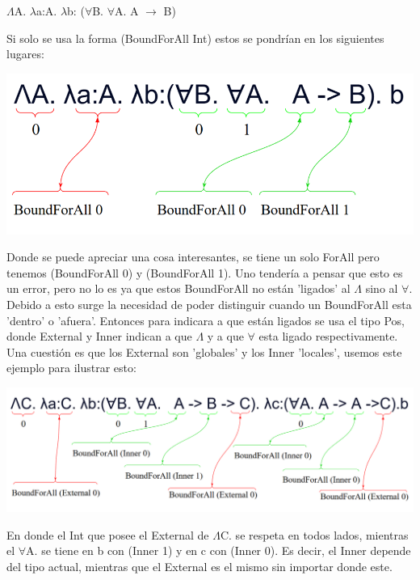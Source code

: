 \documentclass[12pt, titlepage, a4paper]{article}
\begin{document}
\begin{itemize}[label=$\bullet$]
{  \begin{center}
    $\Lambda$A. $\lambda$a:A. $\lambda$b: ($\forall$B. $\forall$A. A $\rightarrow$ B)
  \end{center}

  Si solo se usa la forma (BoundForAll Int) estos se pondrían en los siguientes lugares:

  \begin{center}
    \includegraphics[width=.8\textwidth]{Imagenes/EjemploBoundForAllFunction.png}
  \end{center}

  Donde se puede apreciar una cosa interesantes, se tiene un solo ForAll pero tenemos (BoundForAll 0) y (BoundForAll 1). Uno tendería a 
  pensar que esto es un error, pero no lo es ya que estos BoundForAll no están 'ligados' al $\Lambda$ sino al $\forall$.\\

  Debido a esto surge la necesidad de poder distinguir cuando un BoundForAll esta 'dentro' o 'afuera'. 
  Entonces para indicara a que están ligados se usa el tipo Pos, donde External y Inner indican a que $\Lambda$ y a que $\forall$ esta 
  ligado respectivamente. 
  Una cuestión es que los External son 'globales' y los Inner 'locales', usemos este ejemplo para ilustrar esto:

  \begin{center}
    \includegraphics[width=1\textwidth]{Imagenes/EjemploBoundForAllFunction3.png}
  \end{center}

  En donde el Int que posee el External de $\Lambda$C. se respeta en todos lados, mientras el $\forall$A. se tiene en b con (Inner 1) y en c con (Inner 0). Es decir, 
  el Inner depende del tipo actual, mientras que el External es el mismo sin importar donde este.

}
\end{itemize}
\end{document}
